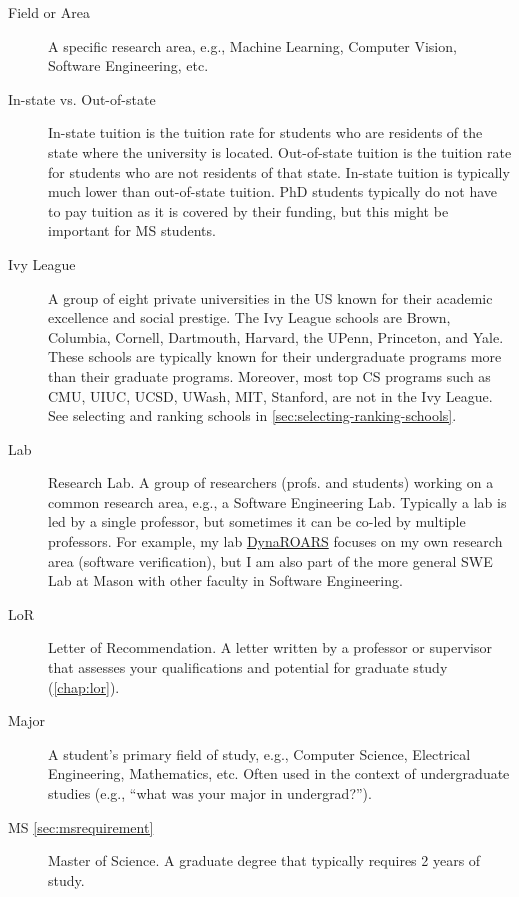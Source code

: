 \documentclass[oneside,11pt,dvipsnames]{book}
\begin{document}
\begin{description}
  \item[Field or Area] A specific research area, e.g., Machine Learning, Computer Vision, Software Engineering, etc.
  
  \item [In-state vs. Out-of-state] In-state tuition is the tuition rate for students who are residents of the state where the university is located. Out-of-state tuition is the tuition rate for students who are not residents of that state. In-state tuition is typically much lower than out-of-state tuition. PhD students typically do not have to pay tuition as it is covered by their funding, but this might be important for MS students.
  
  \item [Ivy League] A group of eight private universities in the US known for their academic excellence and social prestige. The Ivy League schools are Brown, Columbia, Cornell, Dartmouth, Harvard, the UPenn, Princeton, and Yale. These schools are typically known for their undergraduate programs more than their graduate programs. Moreover, most top CS programs such as CMU, UIUC, UCSD, UWash, MIT, Stanford, are not in the Ivy League. See selecting and ranking schools in \autoref{sec:selecting-ranking-schools}.

  \item [Lab] Research Lab. A group of researchers (profs. and students) working on a common research area, e.g., a Software Engineering Lab.  Typically a lab is led by a single professor, but sometimes it can be co-led by multiple professors. For example, my lab \href{https://dynaroars.cs.gmu.edu}{DynaROARS} focuses on my own research area (software verification), but I am also part of the more general SWE Lab at Mason with other faculty in Software Engineering.

  \item[LoR] Letter of Recommendation. A letter written by a professor or supervisor that assesses your qualifications and potential for graduate study (\autoref{chap:lor}).

  \item[Major] A student's primary field of study, e.g., Computer Science, Electrical Engineering, Mathematics, etc. Often used in the context of undergraduate studies (e.g., ``what was your major in undergrad?'').

  \item[MS \autoref{sec:msrequirement}] Master of Science. A graduate degree that typically requires 2 years of study.


\end{description}
\end{document}
